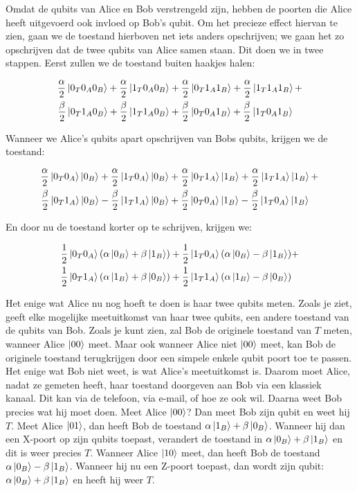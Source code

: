 \documentclass[../../main.tex]{subfiles}
\begin{document}
Omdat de qubits van Alice en Bob verstrengeld zijn, hebben de poorten die Alice heeft uitgevoerd ook invloed op Bob's qubit. Om het precieze effect hiervan te zien, gaan we de toestand hierboven net iets anders opschrijven; we gaan het zo opschrijven dat de twee qubits van Alice samen staan. Dit doen we in twee stappen. Eerst zullen we de toestand buiten haakjes halen:

\begin{align*}
\frac{\alpha}{2}\ket{0_T0_A0_B} + \frac{\alpha}{2}\ket{1_T0_A0_B} &+ 
\frac{\alpha}{2}\ket{0_T1_A1_B} + \frac{\alpha}{2}\ket{1_T1_A1_B} +\\
\frac{\beta}{2}\ket{0_T1_A0_B} +\frac{\beta}{2}\ket{1_T1_A0_B} &+
\frac{\beta}{2}\ket{0_T0_A1_B} +\frac{\beta}{2}\ket{1_T0_A1_B}
\end{align*}

Wanneer we Alice's qubits apart opschrijven van Bobs qubits, krijgen we de toestand:

\begin{align*}
\frac{\alpha}{2}\ket{0_T0_A}\ket{0_B} +\frac{\alpha}{2}\ket{1_T0_A}\ket{0_B} &+\frac{\alpha}{2}\ket{0_T1_A}\ket{1_B} +\frac{\alpha}{2}\ket{1_T1_A}\ket{1_B} +\\
\frac{\beta}{2}\ket{0_T1_A}\ket{0_B} -\frac{\beta}{2}\ket{1_T1_A}\ket{0_B} &+\frac{\beta}{2}\ket{0_T0_A}\ket{1_B} -\frac{\beta}{2}\ket{1_T0_A}\ket{1_B}
\end{align*}

En door nu de toestand korter op te schrijven, krijgen we:

\begin{align*}
\frac{1}{2}\ket{0_T0_A}(\alpha\ket{0_B}+\beta\ket{1_B}) +\frac{1}{2}\ket{1_T0_A}(\alpha\ket{0_B} &- \beta\ket{1_B}) +\\
\frac{1}{2}\ket{0_T1_A}(\alpha\ket{1_B} + \beta\ket{0_B}) +\frac{1}{2}\ket{1_T1_A}(\alpha\ket{1_B} &- \beta\ket{0_B})\\
\end{align*}

Het enige wat Alice nu nog hoeft te doen is haar twee qubits meten. Zoals je ziet, geeft elke mogelijke meetuitkomst van haar twee qubits, een andere toestand van de qubits van Bob. Zoals je kunt zien, zal Bob de originele toestand van $T$ meten, wanneer Alice $\ket{00}$ meet. Maar ook wanneer Alice niet $\ket{00}$ meet, kan Bob de originele toestand terugkrijgen door een simpele enkele qubit poort toe te passen. Het enige wat Bob niet weet, is wat Alice's meetuitkomst is. Daarom moet Alice, nadat ze gemeten heeft, haar toestand doorgeven aan Bob via een klassiek kanaal. Dit kan via de telefoon, via e-mail, of hoe ze ook wil. Daarna weet Bob precies wat hij moet doen. Meet Alice $\ket{00}$? Dan meet Bob zijn qubit en weet hij $T$. Meet Alice $\ket{01}$, dan heeft Bob de toestand $\alpha\ket{1_B} + \beta\ket{0_B}$. Wanneer hij dan een X-poort op zijn qubits toepast, verandert de toestand in $\alpha\ket{0_B} + \beta\ket{1_B}$ en dit is weer precies $T$. Wanneer Alice $\ket{10}$ meet, dan heeft Bob de toestand $\alpha\ket{0_B} - \beta\ket{1_B}$. Wanneer hij nu een Z-poort toepast, dan wordt zijn qubit: $\alpha\ket{0_B} + \beta\ket{1_B}$ en heeft hij weer $T$.
\end{document}
